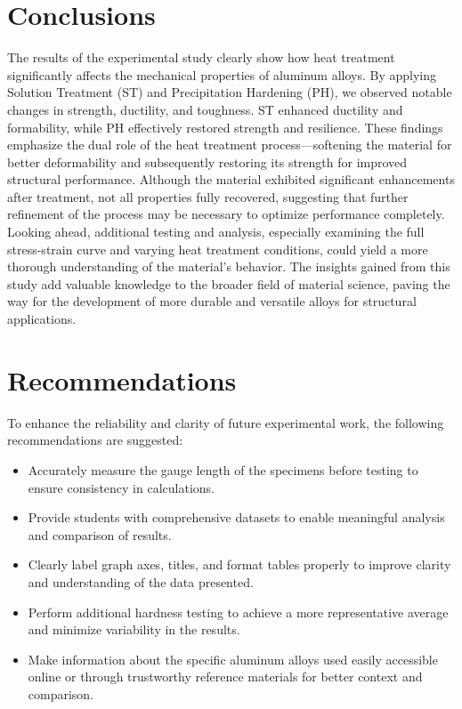 \documentclass{article}
\begin{document}
{    \newpage\vspace*{-30pt}
    \section{Conclusions}
    
    The results of the experimental study clearly show how heat treatment significantly affects the mechanical properties of aluminum alloys. By applying Solution Treatment (ST) and Precipitation Hardening (PH), we observed notable changes in strength, ductility, and toughness. ST enhanced ductility and formability, while PH effectively restored strength and resilience. These findings emphasize the dual role of the heat treatment process—softening the material for better deformability and subsequently restoring its strength for improved structural performance. Although the material exhibited significant enhancements after treatment, not all properties fully recovered, suggesting that further refinement of the process may be necessary to optimize performance completely.\\[8pt]    
    Looking ahead, additional testing and analysis, especially examining the full stress-strain curve and varying heat treatment conditions, could yield a more thorough understanding of the material's behavior. The insights gained from this study add valuable knowledge to the broader field of material science, paving the way for the development of more durable and versatile alloys for structural applications.
    
    \newpage\vspace*{-30pt}
    \section{Recommendations}  
    To enhance the reliability and clarity of future experimental work, the following recommendations are suggested:  
    \begin{itemize}  
        \item Accurately measure the gauge length of the specimens before testing to ensure consistency in calculations.  
        \item Provide students with comprehensive datasets to enable meaningful analysis and comparison of results.  
        \item Clearly label graph axes, titles, and format tables properly to improve clarity and understanding of the data presented.  
        \item Perform additional hardness testing to achieve a more representative average and minimize variability in the results.  
        \item Make information about the specific aluminum alloys used easily accessible online or through trustworthy reference materials for better context and comparison.  
    \end{itemize}      
    
}
\end{document}
